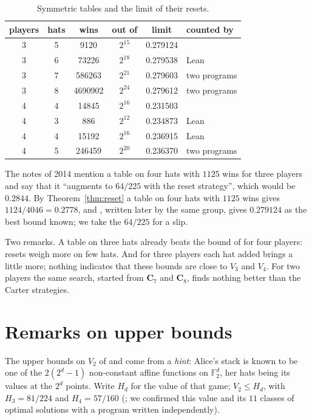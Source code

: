 \documentclass[11pt,a4paper]{article}
\theoremstyle{definition}
\theoremstyle{remark}
\newcommand{\C}{\mathbf{C}}
\begin{document}
\begin{table}[ht]
\centering
\begin{tabular}{@{}cccccl@{}}
\toprule
players & hats & wins & out of & limit & counted by \\
\midrule
3 & 5 & 9120 & $2^{15}$ & 0.279124 & \cite{BFG} \\
3 & 6 & 73226 & $2^{18}$ & 0.279538 & Lean \\
3 & 7 & 586263 & $2^{21}$ & 0.279603 & two programs \\
3 & 8 & 4690902 & $2^{24}$ & 0.279612 & two programs \\
4 & 4 & 14845 & $2^{16}$ & 0.231503 & \cite{BFG} \\
4 & 3 & 886 & $2^{12}$ & 0.234873 & Lean \\
4 & 4 & 15192 & $2^{16}$ & 0.236915 & Lean \\
4 & 5 & 246459 & $2^{20}$ & 0.236370 & two programs \\
\bottomrule
\end{tabular}
\caption{Symmetric tables and the limit of their resets.}
\label{tab:players}
\end{table}

The notes \cite{Wa14} of 2014 mention a table on four hats with $1125$
wins for three players and say that it ``augments to $64/225$ with the
reset strategy'', which would be $0.2844$. By Theorem~\ref{thm:reset} a
table on four hats with $1125$ wins gives $1124/4046 = 0.2778$, and
\cite{BFG}, written later by the same group, gives $0.279124$ as the best
bound known; we take the $64/225$ for a slip.

Two remarks. A table on three hats already beats the bound of \cite{BFG}
for four players: resets weigh more on few hats. And for three players
each hat added brings a little more; nothing indicates that these bounds
are close to $V_3$ and $V_4$. For two players the same search, started
from $\C_7$ and $\C_8$, finds nothing better than the Carter strategies.

\section{Remarks on upper bounds}\label{sec:upper}

The upper bounds on $V_2$ of \cite{BFG} and \cite{Ya26} come from a
\emph{hint}: Alice's stack is known to be one of the $2(2^d-1)$
non-constant affine functions on $\mathbb{F}_2^d$, her hats being its
values at the $2^d$ points. Write $H_d$ for the value of that game;
$V_2 \le H_d$, with $H_3 = 81/224$ \cite{BFG} and $H_4 = 57/160$
(\cite{Ya26}; we confirmed this value and its $11$ classes of optimal
solutions with a program written independently).
\end{document}
